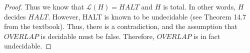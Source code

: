 \documentclass[10pt]{article}
\begin{document}
\begin{enumerate}[label={}]
\begin{proof}
                  Thus we know that $\mathcal{L}(H)=H A L T$ and $H$ is total. In other words, $H$ decides $H A L T$. However, HALT is known to be undecidable (see Theorem 14.7 from the textbook). Thus, there is a contradiction, and the assumption that $OVERLAP$ is decidable must be false. Therefore, $OVERLAP$ is in fact undecidable.

            \end{proof}

\end{enumerate}
\end{document}
